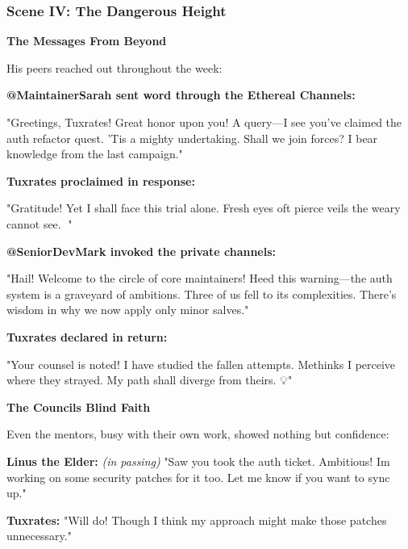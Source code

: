 \bookdivider

\subsubsection{Scene IV: The Dangerous Height}\label{scene-iv-the-dangerous-height}

\textbf{The Messages From Beyond}

His peers reached out throughout the week:

\textbf{@MaintainerSarah sent word through the Ethereal Channels:}

\begin{codeblock}
"Greetings, Tuxrates! Great honor upon you! A query—I see you've claimed the auth refactor quest. 'Tis a mighty undertaking. Shall we join forces? I bear knowledge from the last campaign."
\end{codeblock}

\textbf{Tuxrates proclaimed in response:}

\begin{codeblock}
"Gratitude! Yet I shall face this trial alone. Fresh eyes oft pierce veils the weary cannot see. 🚀"
\end{codeblock}

\textbf{@SeniorDevMark invoked the private channels:}

\begin{codeblock}
"Hail! Welcome to the circle of core maintainers! Heed this warning—the auth system is a graveyard of ambitions. Three of us fell to its complexities. There's wisdom in why we now apply only minor salves."
\end{codeblock}

\textbf{Tuxrates declared in return:}

\begin{codeblock}
"Your counsel is noted! I have studied the fallen attempts. Methinks I perceive where they strayed. My path shall diverge from theirs. 💡"
\end{codeblock}

\textbf{The Council\textquotesingle s Blind Faith}

Even the mentors, busy with their own work, showed nothing but confidence:

\textbf{Linus the Elder:} \emph{(in passing)} "Saw you took the auth ticket. Ambitious! I\textquotesingle m working on some security patches for it too. Let me know if you want to sync up."

\textbf{Tuxrates:} "Will do! Though I think my approach might make those patches unnecessary."

